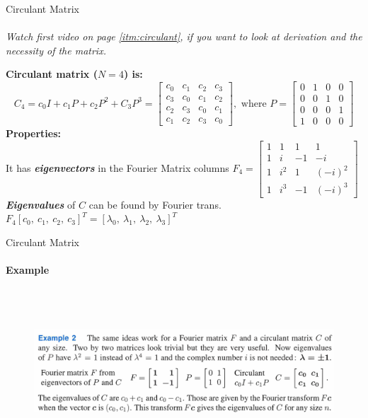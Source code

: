 \documentclass[aspectratio=169]{beamer}
\begin{document}
\begin{frame}[t]{Circulant Matrix}
\framesubtitle{}
\vspace{-0.4cm}
\textit{Watch first video on page \ref{itm:circulant}, if you want to look at derivation and the necessity of the matrix. }
\vspace{-0.2cm}

\textbf{Circulant matrix ($N=4$) is:}
\begin{equation*}
    C_4 = c_0I+ c_1P + c_2P^2 + C_3P^3 = \begin{bmatrix}
    c_0 & c_1 & c_2 & c_3\\
    c_3 & c_0 & c_1 & c_2 \\ 
    c_2 & c_3  & c_0 & c_1 \\
    c_1 & c_2  & c_3 & c_0 
    \end{bmatrix}, \text{ where } P = \begin{bmatrix}
    0 & 1 & 0 & 0\\
    0 & 0 & 1 & 0 \\ 
    0 & 0  & 0 & 1 \\
    1 & 0  & 0 & 0 
    \end{bmatrix}
\end{equation*}
\textbf{Properties:} \\ 
It has \textbf{\textit{eigenvectors}} in the Fourier Matrix columns $F_4 = \begin{bmatrix}
1 & 1 & 1 & 1\\
1 & i & -1 & -i \\ 
1 & i^2  & 1 & (-i)^2 \\
1 & i^3  & -1 & (-i)^3 
\end{bmatrix}$ \\

\textit{\textbf{Eigenvalues}} of $C$ can be found by Fourier trans. $F_4[c_0,\ c_1,\ c_2,\ c_3]^T = [\lambda_0,\ \lambda_1,\ \lambda_2,\ \lambda_3]^T$
\end{frame}

\begin{frame}[t]{Circulant Matrix}
\framesubtitle{Example}
    \begin{figure}[H]
        \centering\includegraphics[height=6cm,width=1\textwidth,keepaspectratio]{circ_22.png}
        \label{fig:circ_22.png}
    \end{figure}
\end{frame}
\end{document}
